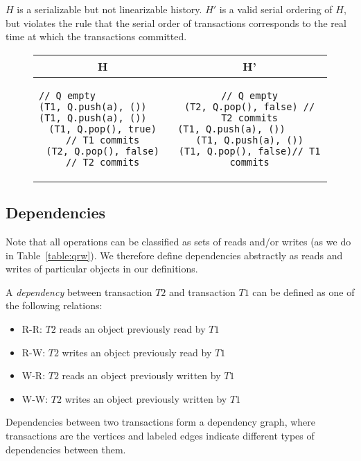 \begin{eg}
$H$ is a serializable but not linearizable history. $H'$ is a valid serial ordering of $H$, but violates the rule that the serial order of transactions corresponds to the real time at which the transactions committed.
    
\begin{figure}[H]
\singlespacing   
    \begin{tabular}{c|c}
H & H'\\
\hline
\begin{lstlisting}
// Q empty                          
(T1, Q.push(a), ())                
(T1, Q.push(a), ())               
(T1, Q.pop(), true)  // T1 commits
(T2, Q.pop(), false) // T2 commits
\end{lstlisting} & 
\begin{lstlisting}
// Q empty
(T2, Q.pop(), false) // T2 commits
(T1, Q.push(a), ())                       
(T1, Q.push(a), ())
(T1, Q.pop(), false)// T1 commits
\end{lstlisting}
    \end{tabular}
\end{figure}
\end{eg}

\subsection{Dependencies}

Note that all operations can be classified as sets of reads and/or writes (as we do in Table~\ref{table:qrw}). We therefore define dependencies abstractly as reads and writes of particular objects in our definitions.

\begin{defn}
    A \emph{dependency} between transaction $T2$ and transaction $T1$ can be defined as one of the following relations:
    \begin{itemize}
        \item R-R: $T2$ reads an object previously read by $T1$
        \item R-W: $T2$ writes an object previously read by $T1$
        \item W-R: $T2$ reads an object previously written by $T1$
        \item W-W: $T2$ writes an object previously written by $T1$
    \end{itemize}
    Dependencies between two transactions form a dependency graph, where transactions are the vertices and labeled edges indicate different types of dependencies between them.
\end{defn}

